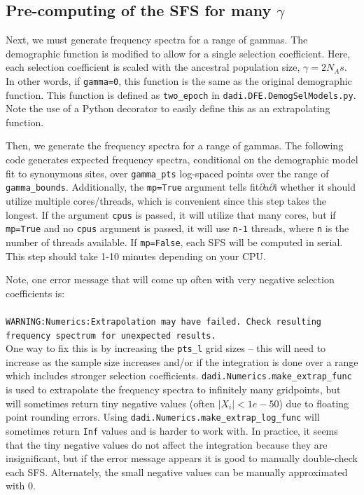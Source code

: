 \documentclass[12pt]{article}
\begin{document}
\subsection{Pre-computing of the SFS for many $\gamma$}

Next, we must generate frequency spectra for a range of gammas. The demographic function is modified to allow for a single selection coefficient. Here, each selection coefficient is scaled with the ancestral population size, $\gamma=2N_As$. In other words, if \texttt{gamma=0}, this function is the same as the original demographic function.
This function is defined as \texttt{two\_epoch} in \texttt{dadi.DFE.DemogSelModels.py}. Note the use of a Python decorator to easily define this as an extrapolating function.



Then, we generate the frequency spectra for a range of gammas. The following code generates expected frequency spectra, conditional on the demographic model fit to synonymous sites, over \texttt{gamma\_pts} log-spaced points over the range of \texttt{gamma\_bounds}. Additionally, the \texttt{mp=True} argument tells fit$\partial$a$\partial$i whether it should utilize multiple cores/threads, which is convenient since this step takes the longest. If the argument \texttt{cpus} is passed, it will utilize that many cores, but if \texttt{mp=True} and no \texttt{cpus} argument is passed, it will use \texttt{n-1} threads, where \texttt{n} is the number of threads available. If \texttt{mp=False}, each SFS will be computed in serial. This step should take 1-10 minutes depending on your CPU.



Note, one error message that will come up often with very negative selection coefficients is: \\ \\
\texttt{WARNING:Numerics:Extrapolation may have failed. Check resulting frequency spectrum for unexpected results.} \\

One way to fix this is by increasing the \texttt{pts\_l} grid sizes -- this will need to increase as the sample size increases and/or if the integration is done over a range which includes stronger selection coefficients. \texttt{dadi.Numerics.make\_extrap\_func} is used to extrapolate the frequency spectra to infinitely many gridpoints, but will sometimes return tiny negative values (often $|X_i|<1e-50$) due to floating point rounding errors. Using \texttt{dadi.Numerics.make\_extrap\_log\_func} will sometimes return \texttt{Inf} values and is harder to work with. In practice, it seems that the tiny negative values do not affect the integration because they are insignificant, but if the error message appears it is good to manually double-check each SFS. Alternately, the small negative values can be manually approximated with 0.
\end{document}
